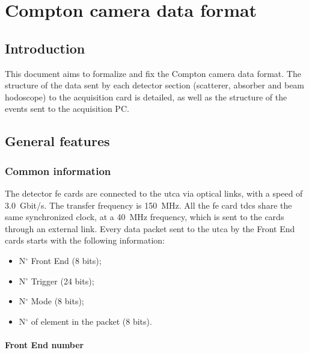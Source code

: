 \chapter{Compton camera data format}\label{chap::appA}

\glsresetall



\section{Introduction}\label{chapappA::sec::Intro}

This document aims to formalize and fix the Compton camera data format. The structure of the data sent by each detector section (scatterer, absorber and beam hodoscope) to the acquisition card is detailed, as well as the structure of the events sent to the acquisition PC.


\section{General features}\label{chapappA::sec::GenFeat}


\subsection{Common information}\label{chapappA::subsec::cmnInfo}

The detector \gls{fe} cards are connected to the \gls{utca} via optical links, with a speed of 3.0~Gbit/s. The transfer frequency is 150~MHz.\newline
All the \gls{fe} card \glspl{tdc} share the same synchronized clock, at a 40~MHz frequency, which is sent to the cards through an external link.\newline
Every data packet sent to the \gls{utca} by the Front End cards starts with the following information:
\begin{itemize}
	\item N$^{\circ}$ Front End (8 bits);
	\item N$^{\circ}$ Trigger (24 bits);
	\item N$^{\circ}$ Mode (8 bits);
	\item N$^{\circ}$ of element in the packet (8 bits).
\end{itemize}

\subsubsection{Front End number}\label{chapappA::subsubsec::FEnum}

